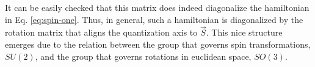 It can be easily checked that this matrix does indeed diagonalize the hamiltonian in Eq. \eqref{eq:spin-one}. Thus, in general, such a hamiltonian is diagonalized by the rotation matrix that aligns the quantization axis to $\vec{S}$. This nice structure emerges due to the relation between the group that governs spin transformations, $SU(2)$, and the group that governs rotations in euclidean space, $SO(3)$\cite{palash2019}.